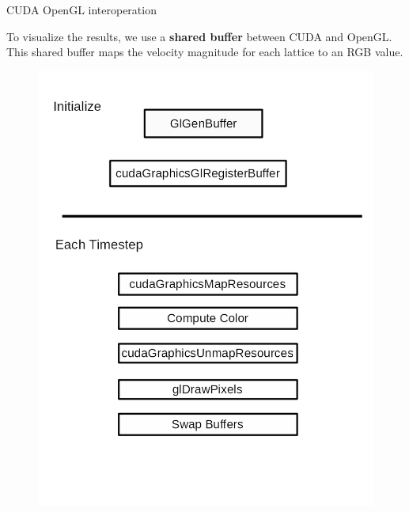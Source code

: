 \documentclass[9pt]{beamer}
\begin{document}
\begin{frame}{CUDA OpenGL interoperation}

To visualize the results, we use a \textbf{shared buffer} between CUDA and OpenGL. This shared buffer maps the velocity magnitude for each lattice to an RGB value. 

\begin{figure}
\begin{center}
	\includegraphics[scale=0.25]{images/opengl.png}
\end{center}
\end{figure}

\end{frame}
\end{document}
